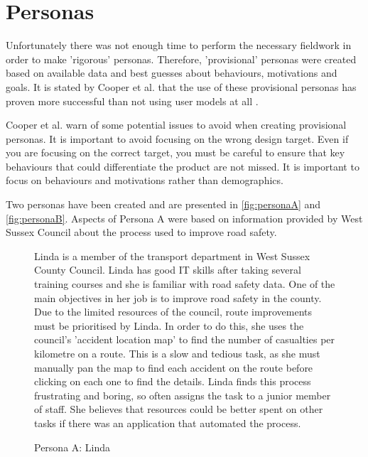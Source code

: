 \documentclass[authoryearcitations]{UoYCSproject}
\begin{document}
\section{Personas} 

Unfortunately there was not enough time to perform the necessary fieldwork in order to make 'rigorous' personas. Therefore, 'provisional' personas were created based on available data and best guesses about behaviours, motivations and goals. It is stated by Cooper et al. that the use of these provisional personas has proven more successful than not using user models at all \citep{Cooper2007}. 

Cooper et al. warn of some potential issues to avoid when creating provisional personas. It is important to avoid focusing on the wrong design target. Even if you are focusing on the correct target, you must be careful to ensure that key behaviours that could differentiate the product are not missed. It is important to focus on behaviours and motivations rather than demographics.

Two personas have been created and are presented in \autoref{fig:personaA} and \autoref{fig:personaB}. Aspects of Persona A were based on information provided by West Sussex Council about the process used to improve road safety\citep{WestSussexCountyCouncil}.

\begin{figure}
	\begin{framed}
 		Linda is a member of the transport department in West Sussex County Council. Linda has good IT skills after taking several training courses and she is familiar with road safety data. One of the main objectives in her job is to improve road safety in the county. Due to the limited resources of the council, route improvements must be prioritised by Linda. In order to do this, she uses the council's 'accident location map' to find the number of casualties per kilometre on a route. This is a slow and tedious task, as she must manually pan the map to find each accident on the route before clicking on each one to find the details. Linda finds this process frustrating and boring, so often assigns the task to a junior member of staff. She believes that resources could be better spent on other tasks if there was an application that automated the process.
  	\end{framed}
  \caption{Persona A: Linda}
  \label{fig:personaA}
\end{figure}
\end{document}
